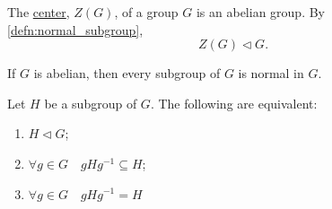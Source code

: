 \begin{eg}
  The \hyperref[defn:center_of_a_group]{center}, $Z(G)$, of a group $G$ is an abelian group. By \cref{defn:normal_subgroup},
  \begin{equation*}
    Z(G) \triangleleft G.
  \end{equation*}
\end{eg}

\begin{eg}
  If $G$ is abelian, then every subgroup of $G$ is normal in $G$.
\end{eg}

\begin{propononum}
  Let $H$ be a subgroup of $G$. The following are equivalent:
  \begin{enumerate}
    \item $H \triangleleft G$;
    \item $\forall g \in G \quad gHg^{-1} \subseteq H$;
    \item $\forall g \in G \quad gHg^{-1} = H$ 
  \end{enumerate}
\end{propononum}




